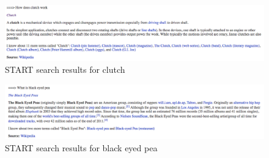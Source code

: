 \documentclass[10pt,letterpaper,bibliography=totoc]{scrartcl}
\begin{document}
\begin{figure}[h!]
\centering
\label{fig:start-clutch}
\includegraphics[scale=.5]{start-clutch.png}
\caption{START search results for clutch}
\end{figure}

\begin{figure}[h!]
\centering
\label{fig:start-black-eyed-pea}
\includegraphics[scale=.5]{start-black-eyed-pea.png}
\caption{START search results for black eyed pea}
\end{figure}
\end{document}
